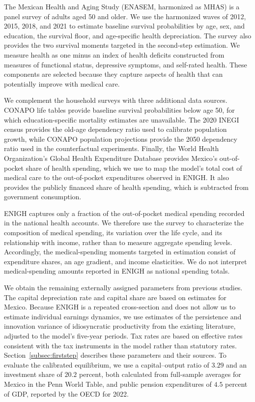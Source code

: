 \documentclass[12pt,a4paper]{article}
\begin{document}
The Mexican Health and Aging Study (ENASEM, harmonized as MHAS) is a panel survey of adults aged 50 and older. We use the harmonized waves of 2012, 2015, 2018, and 2021 to estimate baseline survival probabilities by age, sex, and education, the survival floor, and age-specific health depreciation. The survey also provides the two survival moments targeted in the second-step estimation. We measure health as one minus an index of health deficits constructed from measures of functional status, depressive symptoms, and self-rated health. These components are selected because they capture aspects of health that can potentially improve with medical care.

We complement the household surveys with three additional data sources. CONAPO life tables provide baseline survival probabilities below age 50, for which education-specific mortality estimates are unavailable. The 2020 INEGI census provides the old-age dependency ratio used to calibrate population growth, while CONAPO population projections provide the 2050 dependency ratio used in the counterfactual experiments. Finally, the World Health Organization's Global Health Expenditure Database provides Mexico's out-of-pocket share of health spending, which we use to map the model's total cost of medical care to the out-of-pocket expenditures observed in ENIGH. It also provides the publicly financed share of health spending, which is subtracted from government consumption.

ENIGH captures only a fraction of the out-of-pocket medical spending recorded in the national health accounts. We therefore use the survey to characterize the composition of medical spending, its variation over the life cycle, and its relationship with income, rather than to measure aggregate spending levels. Accordingly, the medical-spending moments targeted in estimation consist of expenditure shares, an age gradient, and income elasticities. We do not interpret medical-spending amounts reported in ENIGH as national spending totals.

We obtain the remaining externally assigned parameters from previous studies. The capital depreciation rate and capital share are based on estimates for Mexico. Because ENIGH is a repeated cross-section and does not allow us to estimate individual earnings dynamics, we use estimates of the persistence and innovation variance of idiosyncratic productivity from the existing literature, adjusted to the model's five-year periods. Tax rates are based on effective rates consistent with the tax instruments in the model rather than statutory rates. Section~\ref{subsec:firststep} describes these parameters and their sources. To evaluate the calibrated equilibrium, we use a capital--output ratio of $3.29$ and an investment share of $20.2$ percent, both calculated from full-sample averages for Mexico in the Penn World Table, and public pension expenditures of $4.5$ percent of GDP, reported by the OECD for 2022.
\end{document}

